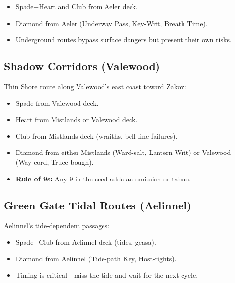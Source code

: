 \begin{itemize}
\item Spade+Heart and Club from Aeler deck.
\item Diamond from Aeler (Underway Pass, Key-Writ, Breath Time).
\item Underground routes bypass surface dangers but present their own risks.
\end{itemize}

\subsection{Shadow Corridors (Valewood)}
\label{subsec:shadow-corridors}

Thin Shore route along Valewood's east coast toward Zakov:
\begin{itemize}
\item Spade from Valewood deck.
\item Heart from Mistlands or Valewood deck.
\item Club from Mistlands deck (wraiths, bell-line failures).
\item Diamond from either Mistlands (Ward-salt, Lantern Writ) or Valewood (Way-cord, Truce-bough).
\item \textbf{Rule of 9s:} Any 9 in the seed adds an omission or taboo.
\end{itemize}

\subsection{Green Gate Tidal Routes (Aelinnel)}
\label{subsec:green-gate}

Aelinnel's tide-dependent passages:
\begin{itemize}
\item Spade+Club from Aelinnel deck (tides, geasa).
\item Diamond from Aelinnel (Tide-path Key, Host-rights).
\item Timing is critical—miss the tide and wait for the next cycle.
\end{itemize}

